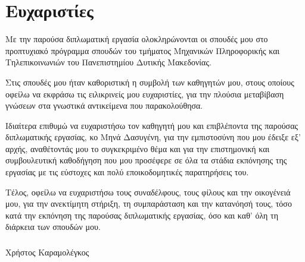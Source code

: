\chapter*{Ευχαριστίες}
Με την παρούσα διπλωματική εργασία ολοκληρώνονται οι σπουδές μου στο προπτυχιακό πρόγραμμα σπουδών του τμήματος Μηχανικών Πληροφορικής και Τηλεπικοινωνιών του Πανεπιστημίου Δυτικής Μακεδονίας.

Στις σπουδές μου ήταν καθοριστική η συμβολή των καθηγητών μου, στους οποίους οφείλω να εκφράσω τις ειλικρινείς μου ευχαριστίες, για την πλούσια μεταβίβαση γνώσεων στα γνωστικά αντικείμενα που παρακολούθησα.

Ιδιαίτερα επιθυμώ να ευχαριστήσω τον καθηγητή μου και επιβλέποντα της παρούσας διπλωματικής εργασίας, κο Μηνά Δασυγένη, για την
εμπιστοσύνη που μου έδειξε εξ’ αρχής, αναθέτοντάς μου το συγκεκριμένο θέμα και για την επιστημονική και συμβουλευτική καθοδήγηση που μου προσέφερε σε όλα τα στάδια εκπόνησης της εργασίας με τις εύστοχες και πολύ εποικοδομητικές παρατηρήσεις του.

Τέλος, οφείλω να ευχαριστήσω τους συναδέλφους, τους φίλους και την οικογένειά μου, για την ανεκτίμητη στήριξη, τη συμπαράσταση και την κατανόησή τους, τόσο κατά την εκπόνηση της παρούσας διπλωματικής εργασίας, όσο και καθ' όλη τη διάρκεια των σπουδών μου.

\paragraph*{}
\hfill Χρήστος Καραμολέγκος
